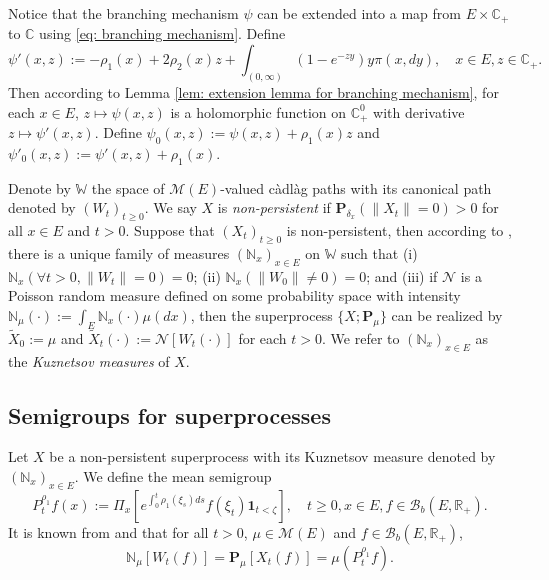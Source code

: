 \documentclass[EJP]{ejpecp} %
\begin{document}
	Notice that the branching mechanism $\psi$ can be extended into a map from $E \times \mathbb C_+$ to $\mathbb C$ using \eqref{eq: branching mechanism}.
	Define
\[
  	\psi'(x,z)
  	:= - \rho_1(x) + 2\rho_2(x) z + \int_{(0,\infty)} (1-e^{-zy})y\pi(x,dy),
  	\quad x\in E, z\in \mathbb C_+.
\]
	Then according to Lemma \ref{lem: extension lemma for branching mechanism}, for each $x \in E$, $z \mapsto \psi(x,z)$ is a holomorphic function on $\mathbb C_+^0$ with derivative $z \mapsto \psi'(x,z)$.
	Define $\psi_0(x,z) := \psi(x,z)+ \rho_1(x)z $ and $\psi'_0(x,z) := \psi'(x,z) + \rho_1(x)$.

	Denote by $\mathbb W$ the space of $\mathcal M(E)$-valued c\`{a}dl\`{a}g paths with its canonical path denoted by $(W_t)_{t\geq 0}$.
	We say $X$ is \emph{non-persistent} if $\mathbf P_{\delta_x}(\|X_t\|= 0) > 0$ for all $x\in E$ and $t> 0$.
	Suppose that $(X_t)_{t\geq 0}$ is non-persistent, then according to \cite[Section 8.4]{Li2011Measure-valued}, there is a unique family of measures $(\mathbb N_x)_{x\in E}$ on $\mathbb W$ such that
	(i) $\mathbb N_x (\forall t > 0, \|W_t\|=0) =0$;
	(ii) $\mathbb N_x(\|W_0 \|\neq 0) = 0$;
	and (iii) if $\mathcal N$ is a Poisson random measure defined on some probability space with intensity $\mathbb N_\mu(\cdot):= \int_E \mathbb N_x(\cdot )\mu(dx)$, then the superprocess $\{X;\mathbf P_\mu\}$ can be realized by $\widetilde X_0 := \mu$ and $\widetilde X_t(\cdot) := \mathcal N[W_t(\cdot)]$ for each $t>0$.
	We refer to $(\mathbb N_x)_{x\in E}$ as the \emph{Kuznetsov measures} of $X$.

\subsection{Semigroups for superprocesses}
\label{sec: definition of vf}
	Let $X$ be a non-persistent superprocess with its Kuznetsov measure denoted by $(\mathbb N_x)_{x\in E}$.
	We define the mean semigroup
\[
  	P_t^{\rho_1} f(x)
  	:= \Pi_{x}[e^{\int_0^t \rho_1(\xi_s)ds}f(\xi_t) \mathbf 1_{t< \zeta}],
  	\quad t\geq 0, x\in E, f\in \mathcal B_b(E,\mathbb R_+).
\]
	It is known from \cite[Proposition 2.27]{Li2011Measure-valued} and \cite[Theorem 2.7]{Kyprianou2014Fluctuations} that for all $t > 0$, $\mu \in \mathcal M(E)$ and $f\in \mathcal B_b(E,\mathbb R_+)$,
\begin{equation}
\label{eq: mean formula for superprocesses}
	\mathbb N_{\mu}[W_t(f)]
	=\mathbf P_{\mu}[X_t(f)]
	=\mu(P^{\rho_1}_t f).
\end{equation}
\end{document}
